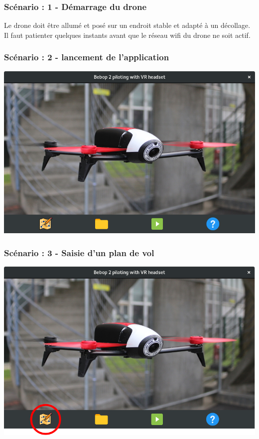 \documentclass{beamer}
\begin{document}
	\begin{frame}
		\begin{center}
		\frametitle{Scénario : 1 - Démarrage du drone}
        Le drone doit être allumé et posé sur un endroit stable et adapté à un décollage.\\
        Il faut patienter quelques instants avant que le réseau wifi du drone ne soit actif.\\
		\end{center}
	\end{frame}



	\begin{frame}
		\begin{center}
		\frametitle{Scénario : 2 - lancement de l'application}

        \includegraphics[scale=0.4]{main-GUI.png}
		\end{center}
	\end{frame}
	


	\begin{frame}
		\begin{center}
		\frametitle{Scénario : 3 - Saisie d'un plan de vol}

        \includegraphics[scale=0.4]{createMap.png}
		\end{center}
	\end{frame}
	
\end{document}
